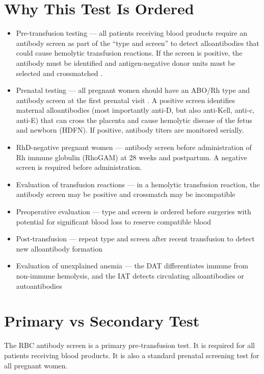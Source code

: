 \section*{Why This Test Is Ordered}
\begin{itemize}
  \item Pre-transfusion testing --- all patients receiving blood products require an antibody screen as part of the ``type and screen'' to detect alloantibodies that could cause hemolytic transfusion reactions. If the screen is positive, the antibody must be identified and antigen-negative donor units must be selected and crossmatched \cite{aabb2020technical}.
  \item Prenatal testing --- all pregnant women should have an ABO/Rh type and antibody screen at the first prenatal visit \cite{rcog2014management}. A positive screen identifies maternal alloantibodies (most importantly anti-D, but also anti-Kell, anti-c, anti-E) that can cross the placenta and cause hemolytic disease of the fetus and newborn (HDFN). If positive, antibody titers are monitored serially.
  \item RhD-negative pregnant women --- antibody screen before administration of Rh immune globulin (RhoGAM) at 28 weeks and postpartum. A negative screen is required before administration.
  \item Evaluation of transfusion reactions --- in a hemolytic transfusion reaction, the antibody screen may be positive and crossmatch may be incompatible
  \item Preoperative evaluation --- type and screen is ordered before surgeries with potential for significant blood loss to reserve compatible blood
  \item Post-transfusion --- repeat type and screen after recent transfusion to detect new alloantibody formation
  \item Evaluation of unexplained anemia --- the DAT differentiates immune from non-immune hemolysis, and the IAT detects circulating alloantibodies or autoantibodies
\end{itemize}

\section*{Primary vs Secondary Test}
The RBC antibody screen is a primary pre-transfusion test. It is required for all patients receiving blood products. It is also a standard prenatal screening test for all pregnant women.

